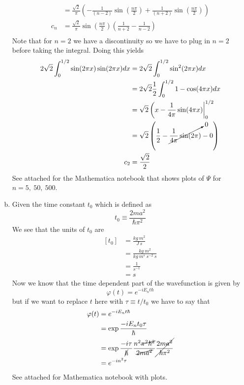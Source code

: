 \documentclass[11pt]{article}
\numberwithin{equation}{section}
\begin{document}
\begin{enumerate}[(a)]
\begin{align*}
&= \frac{\sqrt{2}}{\pi}\left(-\frac{1}{(n-2)}\sin\left(\frac{n\pi}{2}\right) + \frac{1}{(n+2)}\sin\left(\frac{n\pi}{2}\right)\right)\\
c_n &= \frac{\sqrt{2}}{\pi}\sin\left(\frac{n\pi}{2}\right)\left(\frac{1}{n+2}-\frac{1}{n-2}\right)\\
\end{align*}
Note that for $n=2$ we have a discontinuity so we have to plug in $n=2$ before taking the integral. Doing this yields
\begin{align*}
2\sqrt{2}\int_0^{1/2}\sin(2\pi x)\sin(2\pi x)dx &= 2\sqrt{2}\int_0^{1/2}\sin^2(2\pi x)dx \\
&= 2\sqrt{2}\frac{1}{2}\int_0^{1/2}1-\cos(4\pi x)dx \\
&= \sqrt{2}\left(x-\frac{1}{4\pi}\sin(4\pi x)\right|_0^{1/2} \\
&= \sqrt{2}\left(\frac{1}{2}-\cancelto{0}{\frac{1}{4\pi}\sin(2\pi)} - 0\right) \\
c_2 &= \frac{\sqrt{2}}{2}
\end{align*}
See attached for the Mathematica notebook that shows plots of $\Psi$ for $n=5,\ 50,\ 500$.

\item
Given the time constant $t_0$ which is defined as
$$t_0 \equiv \frac{2ma^2}{\hbar \pi^2}$$
We see that the units of $t_0$ are 
\begin{align*}
\left[t_0\right] &= \frac{kg\ m^2}{J\ s}\\
&= \frac{kg\ m^2}{kg\ m^s\ s^{-2}\ s}\\
&= \frac{1}{s^{-1}}\\
&= s
\end{align*}
Now we know that the time dependent part of the wavefunction is given by
$$\varphi(t) = e^{-iE_nt\hbar}$$
but if we want to replace $t$ here with $\tau\equiv t/t_0$ we have to say that
\begin{align*}
\varphi(t) &= e^{-iE_nt\hbar}\\
&= \exp{\frac{-iE_nt_0\tau}{\hbar}}\\
&= \exp{\frac{-i\tau}{\cancel{\hbar}}\frac{n^2\cancel{\pi^2\hbar^2}}{\cancel{2ma^2}}\cancel{\frac{2ma^2}{\hbar \pi^2}}}\\
&= e^{-in^2\tau}
\end{align*}
See attached for Mathematica notebook with plots.
\end{enumerate}
\end{document}
